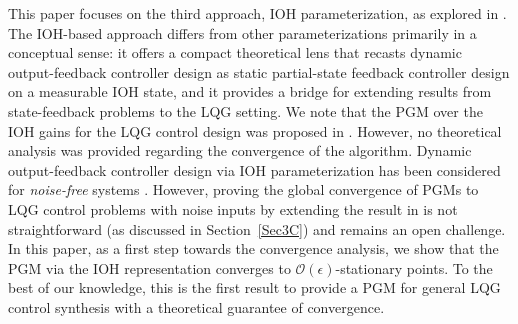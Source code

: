 \documentclass[preprint,5p,times,twocolumn]{elsarticle}
\begin{document}
This paper focuses on the third approach, IOH parameterization, as explored in \cite{sadamoto2024policy, al2022behavioral}. 
The IOH-based approach differs from other parameterizations primarily in a conceptual sense: it offers a compact theoretical lens that recasts dynamic output-feedback controller design as static partial-state feedback controller design on a measurable IOH state, and it provides a bridge for extending results from state-feedback problems to the LQG setting. We note that the PGM over the IOH gains for the LQG control design was proposed in \cite{al2022behavioral}. However, no theoretical analysis was provided regarding the convergence of the algorithm. Dynamic output-feedback controller design via IOH parameterization has been considered for {\it noise-free} systems \cite{sadamoto2024policy}. However, proving the global convergence of PGMs to LQG control problems with noise inputs by extending the result in \cite{sadamoto2024policy} is not straightforward (as discussed in Section~\ref{Sec3C}) and remains an open challenge. In this paper, as a first step towards the convergence analysis, we show that the PGM via the IOH representation converges to $\mathcal O(\epsilon)$-stationary points. To the best of our knowledge, this is the first result to provide a PGM for general LQG control synthesis with a theoretical guarantee of convergence. 


\end{document}
